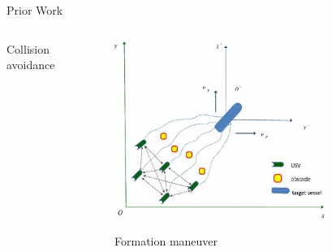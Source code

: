 \documentclass[9pt]{beamer}
\begin{document}
\begin{frame}{Prior Work}
\begin{columns}
\begin{column}{0.45\textwidth}
\begin{block}{}
\begin{center}
                    Collision avoidance 
                \end{center}
            \end{block}
        \end{column}
        \begin{column}{0.45\textwidth}
            \begin{block}{}
                \begin{center}
                    \includegraphics[width=0.7\textwidth,trim={1cm 1cm 4cm 3cm},clip]{img/formation.jpg}

                    Formation maneuver
                \end{center}
            \end{block}
        \end{column}
    \end{columns}
\end{frame}
\end{document}

